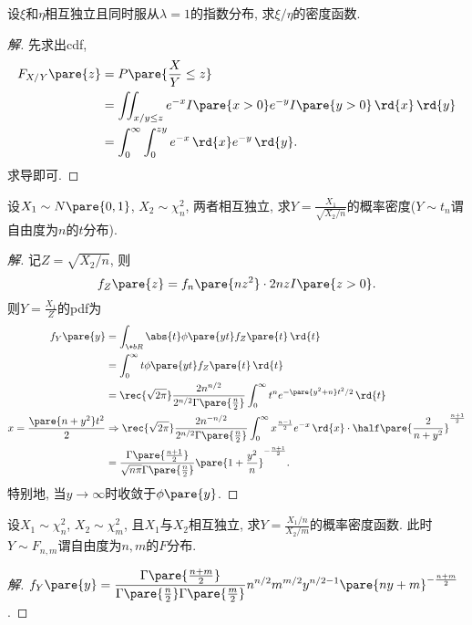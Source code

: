 \documentclass[../Statistics.tex]{subfiles}
\begin{document}
\begin{sample}
    \begin{ex}
        设$\xi$和$\eta$相互独立且同时服从$\lambda=1$的指数分布, 求$\xi/\eta$的密度函数.
    \end{ex}
    \begin{proof}[解]
        先求出cdf,
        \begin{align*}
            F_{X/Y}\pare{z} &= P\pare{\frac{X}{Y}\le z} \\
            &= \iint_{x/y\le z} e^{-x}I\pare{x>0} e^{-y} I\pare{y>0}\,\rd{x}\,\rd{y} \\
            &= \int_0^{\infty}\int_0^{zy} e^{-x} \,\rd{x}e^{-y}\,\rd{y}.
        \end{align*}
        求导即可.
    \end{proof}
\end{sample}
\begin{sample}
    \begin{ex}
        设$X_1\sim N\pare{0,1}$, $X_2\sim \chi_n^2$, 两者相互独立, 求$\displaystyle Y = \frac{X_1}{\sqrt{X_2/n}}$的概率密度($Y\sim t_n$谓自由度为$n$的$t$分布).
    \end{ex}
    \begin{proof}[解]
        记$Z = \sqrt{X_2/n}$, 则
        \[ f_Z\pare{z} = f_n\pare{nz^2}\cdot 2nz I\pare{z>0}. \]
        则$Y=\displaystyle \frac{X_1}{Z}$的pdf为
        \begin{align*}
            f_Y\pare{y} &= \int_{\+bR} \abs{t}\phi\pare{yt} f_Z\pare{t}\,\rd{t} \\
            &= \int_0^{\infty} t\phi\pare{yt} f_Z\pare{t}\,\rd{t} \\
            &= \rec{\sqrt{2\pi}} \frac{2n^{n/2}}{2^{n/2}\Gamma\pare{\frac{n}{2}}} \int_0^{\infty} t^n e^{-\pare{y^2+n}t^2/2}\,\rd{t} \\
           x=\frac{\pare{n+y^2}t^2}{2} &\Rightarrow \rec{\sqrt{2\pi}} \frac{2n^{-n/2}}{2^{n/2}\Gamma\pare{\frac{n}{2}}}\int_0^\infty x^{\frac{n-1}{2}}e^{-x}\,\rd{x} \cdot \half \pare{\frac{2}{n+y^2}}^{\frac{n+1}{2}} \\
           &= \frac{\Gamma\pare{\frac{n+1}{2}}}{\sqrt{n\pi}\Gamma\pare{\frac{n}{2}}} \pare{1+\frac{y^2}{n}}^{-\frac{n+1}{2}}.
        \end{align*}
        特别地, 当$y\rightarrow\infty$时收敛于$\phi\pare{y}$.
    \end{proof}
\end{sample}
\begin{sample}
    \begin{ex}
        设$X_1\sim \chi_n^2$, $X_2\sim \chi_m^2$, 且$X_1$与$X_2$相互独立, 求$Y = \displaystyle\frac{X_1/n}{X_2/m}$的概率密度函数. 此时$Y\sim F_{n,m}$谓自由度为$n,m$的$F$分布.
    \end{ex}
    \begin{proof}[解]
        $\displaystyle f_Y\pare{y} = \frac{\Gamma\pare{\frac{n+m}{2}}}{\Gamma\pare{\frac{n}{2}}\Gamma\pare{\frac{m}{2}}}n^{n/2}m^{m/2}y^{n/2-1}\pare{ny+m}^{-\frac{n+m}{2}}$.
    \end{proof}
\end{sample}
\end{document}
